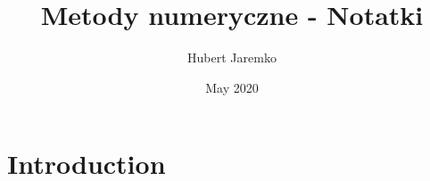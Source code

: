 \documentclass{article}
\title{Metody numeryczne - Notatki}
\author{Hubert Jaremko}
\date{May 2020}
\begin{document}
\maketitle

\section{Introduction}
\end{document}
